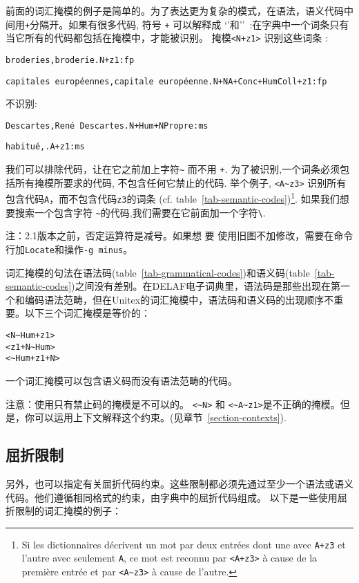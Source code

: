 前面的词汇掩模的例子是简单的。为了表达更为复杂的模式，在语法，语义代码中间用\verb$+$分隔开。如果有很多代码, 符号 \verb$+$ 可以解释成 `'和''~:在字典中一个词条只有当它所有的代码都包括在掩模中，才能被识别。
  掩模\verb$<N+z1>$ 识别这些词条 :

\bigskip
\noindent
\texttt{broderies,broderie.N+z1:fp}

\noindent
\texttt{capitales europ\'eennes,capitale europ\'eenne.N+NA+Conc+HumColl+z1:fp}

\bigskip
\noindent 不识别:

\bigskip
\noindent
\texttt{Descartes,Ren\'e Descartes.N+Hum+NPropre:ms}

\noindent
\texttt{habitu\'e,.A+z1:ms}

\bigskip
\noindent 我们可以排除代码，让在它之前加上字符\verb+~+
而不用 \verb$+$.\index{\verb+~+}
为了被识别,一个词条必须包括所有掩模所要求的代码, 不包含任何它禁止的代码. 举个例子, \verb$<A~z3>$ 识别所有包含代码\verb+A+，而不包含代码\verb+z3+的词条 (cf. table~\ref{tab-semantic-codes})\footnote{Si les dictionnaires décrivent un
mot par deux entrées dont une avec \texttt{A+z3} et l'autre avec seulement \texttt{A}, ce mot est
reconnu par \texttt{<A+z3>} à cause de la première entrée et par
\texttt{<A{\textasciitilde}z3>} à cause de l'autre.}.
如果我们想要搜索一个包含字符 \verb$~$的代码,我们需要在它前面加一个字符\verb+\+.

\bigskip
\noindent 注：2.1版本之前，否定运算符是减号。如果想  要
使用旧图不加修改，需要在命令行加\verb+Locate+和操作\verb+-g minus+。

\bigskip
\noindent 词汇掩模的句法在语法码(table~\ref{tab-grammatical-codes})和语义码(table~\ref{tab-semantic-codes})之间没有差别。在DELAF电子词典里，语法码是那些出现在第一个和编码语法范畴，但在Unitex的词汇掩模中，语法码和语义码的出现顺序不重要。以下三个词汇掩模是等价的：

\begin{verbatim}
<N~Hum+z1>
<z1+N~Hum>
<~Hum+z1+N>
\end{verbatim}

\noindent 一个词汇掩模可以包含语义码而没有语法范畴的代码。 

\bigskip
\noindent 注意：使用只有禁止码的掩模是不可以的。 
\verb+<~N>+ 和 \verb+<~A~z1>+是不正确的掩模。但是，你可以运用上下文解释这个约束。(见章节~\ref{section-contexts}).


\subsection{屈折限制}
另外，也可以指定有关屈折代码约束。这些限制都必须先通过至少一个语法或语义代码。他们遵循相同格式的约束，由字典中的屈折代码组成。
以下是一些使用屈折限制的词汇掩模的例子：


